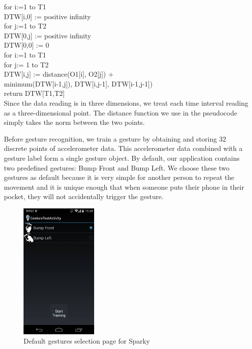 \documentclass[journal]{IEEEtran}
\begin{document}
 	\noindent 
 	\hspace*{0.25cm}for i:=1 to T1\\
 	\hspace*{0.5cm}DTW[i,0] := positive infinity\\
 	\hspace*{0.25cm}for j:=1 to T2\\
 	\hspace*{0.5cm}DTW[0,j] := positive infinity\\
 	\hspace*{0.25cm}DTW[0,0] := 0\\
 	
 	\noindent 
 	\hspace*{0.25cm}for i:=1 to T1\\
 	\hspace*{0.5cm}for j:= 1 to T2\\
 	\hspace*{0.75cm}DTW[i,j] := distance(O1[i], O2[j]) +\\
 	\hspace*{1cm}minimum(DTW[i-1,j]), DTW[i,j-1], DTW[i-1,j-1])\\
 	
 	\noindent 
 	\hspace*{0.25cm}return DTW[T1,T2]\\
 	
\noindent 
Since the data reading is in three dimensions, we treat each time interval reading as a three-dimensional point. The distance function we use in the pseudocode simply takes the norm between the two points. 

Before gesture recognition, we train a gesture by obtaining and storing 32 discrete points of accelerometer data. This accelerometer data combined with a gesture label form a single gesture object. By default, our application contains two predefined gestures: Bump Front and Bump Left. We choose these two gestures as default because it is very simple for another person to repeat the movement and it is unique enough that when someone puts their phone in their pocket, they will not accidentally trigger the gesture.

\begin{figure}[H]
\centering
\includegraphics[width=1.5in]{S1.jpg}
\caption{Default gestures selection page for Sparky}
\label{fig2}
\end{figure}
\end{document}
